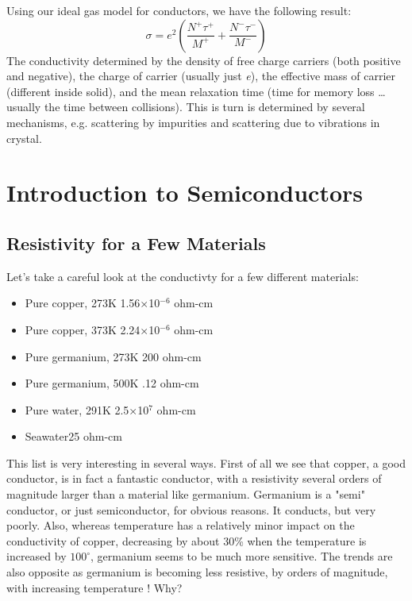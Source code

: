 Using our ideal gas model for conductors, we have the following result:
\begin{equation}
	\sigma  = {e^2}\left( {\frac{{{N^ + }{\tau ^ + }}}{{{M^ + }}} + \frac{{{N^ - }{\tau ^ - }}}{{{M^ - }}}} \right)
\end{equation}
The conductivity determined by the density of free charge carriers (both positive and negative), the charge of carrier (usually just \textit{e}), the effective mass of carrier (different inside solid), and the mean relaxation time (time for memory loss … usually the time between collisions).   This is turn is determined by several mechanisms, e.g. scattering by impurities and scattering due to vibrations in crystal.
 

\section{ Introduction to Semiconductors}


\subsection{Resistivity for a Few Materials}

Let's take a careful look at the conductivty for a few different materials:
\vspace{.5cm}

\begin{minipage}[c]{.65\textwidth}
\begin{itemize}
\item  Pure copper, 273K \hfill 1.56×10$^{-6}$ ohm-cm
\item Pure copper, 373K \hfill 2.24×10$^{-6}$ ohm-cm
\item Pure germanium, 273K \hfill 200 ohm-cm
\item Pure germanium, 500K \hfill .12 ohm-cm
\item Pure water, 291K \hfill 2.5×10$^7$ ohm-cm
\item Seawater\hfill 25 ohm-cm
\end{itemize}  
\end{minipage}
\vspace{.5cm}

This list is very interesting in several ways.  First of all we see that copper, a good conductor, is in fact a fantastic conductor, with a resistivity several orders of magnitude larger than a material like germanium.  Germanium is a "semi" conductor, or just semiconductor, for obvious reasons.  It conducts, but very poorly.  Also, whereas temperature has a relatively minor impact on the conductivity of copper, decreasing by about 30\% when the temperature is increased by $100^\circ$, germanium seems to be much more sensitive.  The trends are also opposite as germanium is becoming less resistive, by orders of magnitude, with increasing temperature !  Why?

